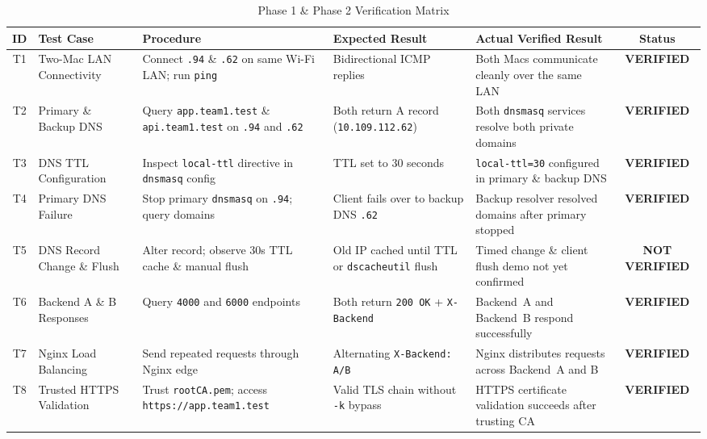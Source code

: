 \documentclass[conference]{IEEEtran}
\begin{document}
\begin{table}[t]
\centering
\caption{Phase 1 & Phase 2 Verification Matrix}
\label{tab:results}
\renewcommand{\arraystretch}{1.18}
\begin{tabular}{@{}cl p{4.0cm} p{3.5cm} p{4.2cm} c@{}}
\toprule
\textbf{ID} & \textbf{Test Case} & \textbf{Procedure} & \textbf{Expected Result} & \textbf{Actual Verified Result} & \textbf{Status} \\
\midrule
T1 & Two-Mac LAN Connectivity & Connect \texttt{.94} \& \texttt{.62} on same Wi-Fi LAN; run \texttt{ping} & Bidirectional ICMP replies & Both Macs communicate cleanly over the same LAN & \textcolor{verifiedgreen}{\textbf{VERIFIED}} \\
T2 & Primary \& Backup DNS & Query \texttt{app.team1.test} \& \texttt{api.team1.test} on \texttt{.94} and \texttt{.62} & Both return A record (\texttt{10.109.112.62}) & Both \texttt{dnsmasq} services resolve both private domains & \textcolor{verifiedgreen}{\textbf{VERIFIED}} \\
T3 & DNS TTL Configuration & Inspect \texttt{local-ttl} directive in \texttt{dnsmasq} config & TTL set to 30 seconds & \texttt{local-ttl=30} configured in primary \& backup DNS & \textcolor{verifiedgreen}{\textbf{VERIFIED}} \\
T4 & Primary DNS Failure & Stop primary \texttt{dnsmasq} on \texttt{.94}; query domains & Client fails over to backup DNS \texttt{.62} & Backup resolver resolved domains after primary stopped & \textcolor{verifiedgreen}{\textbf{VERIFIED}} \\
T5 & DNS Record Change \& Flush & Alter record; observe 30s TTL cache \& manual flush & Old IP cached until TTL or \texttt{dscacheutil} flush & Timed change \& client flush demo not yet confirmed & \textcolor{unverifiedamber}{\textbf{NOT VERIFIED}} \\
T6 & Backend A \& B Responses & Query \texttt{4000} and \texttt{6000} endpoints & Both return \texttt{200 OK} + \texttt{X-Backend} & Backend~A and Backend~B respond successfully & \textcolor{verifiedgreen}{\textbf{VERIFIED}} \\
T7 & Nginx Load Balancing & Send repeated requests through Nginx edge & Alternating \texttt{X-Backend: A/B} & Nginx distributes requests across Backend~A and B & \textcolor{verifiedgreen}{\textbf{VERIFIED}} \\
T8 & Trusted HTTPS Validation & Trust \texttt{rootCA.pem}; access \texttt{https://app.team1.test} & Valid TLS chain without \texttt{-k} bypass & HTTPS certificate validation succeeds after trusting CA & \textcolor{verifiedgreen}{\textbf{VERIFIED}} \\

\end{tabular}
\end{table}
\end{document}
